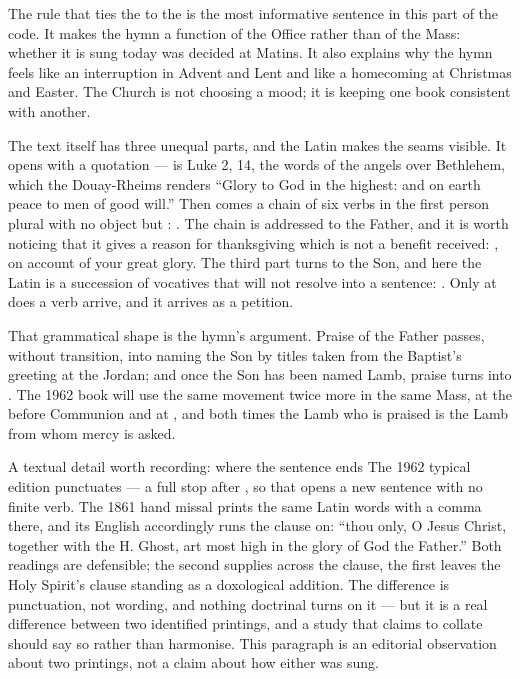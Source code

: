 The rule that ties the  to the  is the most
informative sentence in this part of the code. It makes the hymn a function of
the Office rather than of the Mass: whether it is sung today was decided at
Matins. It also explains why the hymn feels like an interruption in Advent and
Lent and like a homecoming at Christmas and Easter. The Church is not choosing
a mood; it is keeping one book consistent with another.

The text itself has three unequal parts, and the Latin makes the seams visible.
It opens with a quotation ---  is Luke 2, 14, the words of the angels over
Bethlehem, which the Douay-Rheims renders ``Glory to God in the highest: and on
earth peace to men of good will.'' Then comes a chain of six verbs in the first
person plural with no object but : . The chain is addressed to the Father,
and it is worth noticing that it gives a reason for thanksgiving which is not a
benefit received: , on account of your
great glory. The third part turns to the Son, and here the Latin is a
succession of vocatives that will not resolve into a sentence:
. Only at  does a verb arrive, and it arrives as a
petition.

That grammatical shape is the hymn's argument. Praise of the Father passes,
without transition, into naming the Son by titles taken from the Baptist's
greeting at the Jordan; and once the Son has been named Lamb, praise turns into
. The 1962 book will use the same movement twice more
in the same Mass, at the  before Communion and at
, and both times the Lamb who is praised is
the Lamb from whom mercy is asked.

\begin{proposal}{A textual detail worth recording: where the sentence ends}
The 1962 typical edition punctuates  --- a full stop after
, so that  opens a new
sentence with no finite verb. The 1861 hand missal prints the same Latin words
with a comma there, and its English accordingly runs the clause on: ``thou
only, O Jesus Christ, together with the H. Ghost, art most high in the glory of
God the Father.'' Both readings are defensible; the second supplies
 across the clause, the first leaves the Holy Spirit's clause
standing as a doxological addition. The difference is punctuation, not wording,
and nothing doctrinal turns on it --- but it is a real difference between two
identified printings, and a study that claims to collate should say so rather
than harmonise. This paragraph is an editorial observation about two printings,
not a claim about how either was sung.
\end{proposal}
